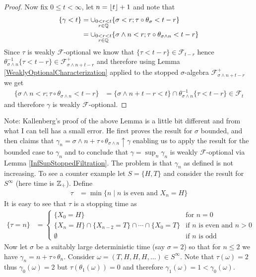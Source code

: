 \begin{proof}
Now fix $0 \leq t < \infty$, let $n = \lfloor t \rfloor+1$
and note that
\begin{align*}
\lbrace \gamma < t \rbrace &= \cup_{\substack{0 < r < t\\r \in
    \mathbb{Q}}} \lbrace \sigma < r ; \tau \circ \theta_\sigma < t -
r\rbrace \\
&=\cup_{\substack{0 < r < t\\r \in
    \mathbb{Q}}} \lbrace \sigma  \wedge n < r ; \tau \circ
\theta_{\sigma \wedge n} < t - r\rbrace
\end{align*}
Since $\tau$ is weakly $\mathcal{F}$-optional we know that $\lbrace
\tau < t-r\rbrace \in \mathcal{F}_{t-r}$ hence $\theta_{\sigma \wedge n}^{-1}
\lbrace \tau < t-r \rbrace \in \mathcal{F}^+_{\sigma \wedge n + t -r}$ and
therefore using Lemma \ref{WeaklyOptionalCharacterization} applied to
the stopped $\sigma$-algebra $\mathcal{F}^+_{\sigma  \wedge n + t -r}$ we get
\begin{align*}
\lbrace \sigma \wedge n < r ; \tau \circ \theta_{\sigma \wedge n}< t - r\rbrace &=
\lbrace \sigma \wedge n +t -r < t \rbrace \cap \theta_{\sigma \wedge n}^{-1} \lbrace \tau
< t -r\rbrace \in \mathcal{F}_t
\end{align*}
and therefore $\gamma$ is weakly $\mathcal{F}$-optional.
\end{proof}

Note: Kallenberg's proof of the above Lemma is a little bit different and
from what I can tell has a small error.  He first
proves the result for $\sigma$ bounded, and then claims that
$\gamma_n = \sigma \wedge n + \tau \circ \theta_{\sigma \wedge n} \uparrow \gamma$ enabling us to apply the result for
the bounded case to
$\gamma_n$ and to conclude that $\gamma = \sup_n \gamma_n$ is weakly
$\mathcal{F}$-optional via Lemma
\ref{InfSupStoppedFiltration}.  The problem is that $\gamma_n$ as
defined is not increasing.  To see a counter example let $S = \lbrace
H,T \rbrace$ and consider the result for $S^\infty$ (here time is $\mathbb{Z}_+$).  Define 
\begin{align*}
\tau &= \min \lbrace n \mid n \text{ is even and } X_n = H \rbrace
\end{align*}
It is easy to see that $\tau$ is a stopping time as 
\begin{align*}
\lbrace \tau = n \rbrace  &= 
\begin{cases}
\lbrace X_0 =  H \rbrace & \text{for $n = 0$} \\
\lbrace X_n = H \rbrace \cap \lbrace X_{n-2} = T \rbrace \cap \dotsb
\cap \lbrace X_0 = T \rbrace & \text{if $n$ is even and $n > 0$} \\
\emptyset & \text{if $n$ is odd}
\end{cases} 
\end{align*}
Now let $\sigma$ be
a suitably large deterministic time (say $\sigma = 2$) so that for $n \leq
2$ we have $\gamma_n = n + \tau \circ \theta_n$.  Consider
$\omega = (T,H,H,H,\dotsc) \in S^\infty$.  Note that $\tau(\omega)
= 2$ thus $\gamma_0(\omega) = 2$ but $\tau(\theta_1(\omega)) = 0$ and
therefore $\gamma_1(\omega) = 1 < \gamma_0(\omega)$. 

